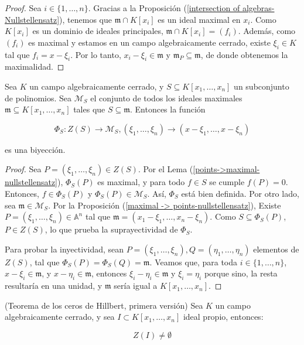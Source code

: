 \begin{proof}
Sea $i \in \{1,\dots,n\}$. Gracias a la Proposición (\ref{intersection of algebras-Nullstellensatz}), tenemos que $\mathfrak{m}\cap K[x_i]$ es un ideal maximal en $x_i$. Como $K[x_i]$ es un dominio de ideales principales, $\mathfrak{m}\cap K[x_i] = (f_i)$. Además, como $(f_i)$ es maximal y estamos en un campo algebraicamente cerrado, existe $\xi_i \in K$ tal que $f_i = x - \xi_i$. Por lo tanto, $x_i - \xi_i \in \mathfrak{m}$ y $\mathfrak{m}_P \subseteq \mathfrak{m}$, de donde obtenemos la maximalidad.
\end{proof}

\begin{theorem} \label{points <-> maximal-nullstellensatz}
Sea $K$ un campo algebraicamente cerrado, y $S \subseteq K[x_1,\dots,x_n]$ un subconjunto de polinomios. Sea $\mathcal{M}_S$ el conjunto de todos los ideales maximales $\mathfrak{m} \subseteq K[x_1,\dots,x_n]$ tales que $S \subseteq \mathfrak{m}$. Entonces la función

$$ \Phi_S:Z(S) \rightarrow \mathcal{M}_S, (\xi_1,\dots,\xi_n) \rightarrow (x - \xi_1,\dots,x - \xi_n) $$

es una biyección.
\end{theorem}

\begin{proof}
Sea $P = (\xi_1,\dots,\xi_n) \in Z(S)$. Por el Lema (\ref{points->maximal-nullstellensatz}), $\Phi_S(P)$ es maximal, y para todo $f \in S$ se cumple $f(P) = 0$. Entonces, $f \in \Phi_S(P)$ y $\Phi_S(P) \in \mathcal{M}_S$. Así, $\Phi_S$ está bien definida. Por otro lado, sea $\mathfrak{m} \in \mathcal{M}_S$. Por la Proposición (\ref{maximal -> points-nullstellensatz}), Existe $P = (\xi_1,\dots,\xi_n) \in \mathbb{A}^n$ tal que $\mathfrak{m} = (x_1 - \xi_1,\dots, x_n - \xi_n)$. Como $S \subseteq \Phi_S(P)$, $P \in Z(S)$, lo que prueba la suprayectividad de $\Phi_S$.

Para probar la inyectividad, sean $P = (\xi_1,\dots, \xi_n), Q = (\eta_1,\dots,\eta_n)$ elementos de $Z(S)$, tal que $\Phi_S(P) = \Phi_S(Q) = \mathfrak{m}$. Veamos que, para toda $i \in \{1, \dots, n\}$, $x - \xi_i \in \mathfrak{m}$, y $x - \eta_i \in \mathfrak{m}$, entonces $\xi_i - \eta_i \in \mathfrak{m}$ y $\xi_i = \eta_i$ porque sino, la resta resultaría en una unidad, y $\mathfrak{m}$ sería igual a $K[x_1,\dots,x_n]$.
\end{proof}

\begin{corollary}
(Teorema de los ceros de Hillbert, primera versión) Sea $K$ un campo algebraicamente cerrado, y sea $I \subset K[x_1,\dots,x_n]$ ideal propio, entonces:

$$ Z(I) \neq \emptyset $$
\end{corollary}


